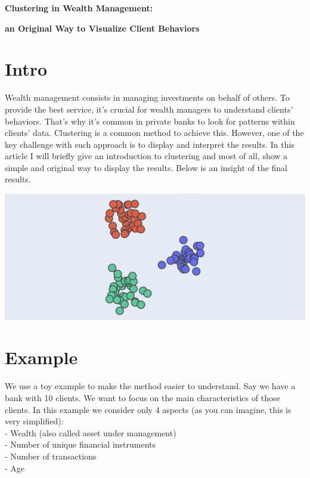 {\fontsize{25pt}{40pt} \textbf{Clustering in Wealth Management:}\par}
{\fontsize{25pt}{40pt} \textbf{an Original Way to Visualize Client Behaviors}\par}

\section{Intro}

Wealth management consists in managing investments on behalf of others. To provide the best service, it's crucial for wealth managers to understand clients' behaviors. That's why it's common in private banks to look for patterns within clients' data. Clustering is a common method to achieve this. However, one of the key challenge with such approach is to display and interpret the results. In this article I will briefly give an introduction to clustering and most of all, show a simple and original way to display the results. Below is an insight of the final results.

\begin{center}
\includegraphics[scale=0.5]{./../img/clusters-static.png}
\end{center}

\section{Example}

We use a toy example to make the method easier to understand. Say we have a bank with 10 clients. We want to focus on the main characteristics of those clients. In this example we consider only 4 aspects (as you can imagine, this is very simplified): \\

- Wealth (also called asset under management) \\
- Number of unique financial instruments \\
- Number of transactions \\
- Age

